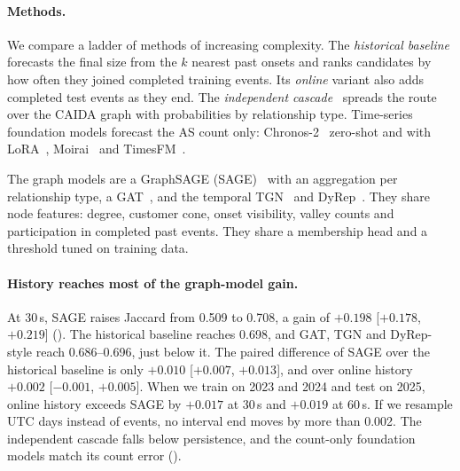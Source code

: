 \paragraph{Methods.}
We compare a ladder of methods of increasing complexity.
The \emph{historical baseline} forecasts the final size from the $k$ nearest past onsets and ranks candidates by how often they joined completed training events.
Its \emph{online} variant also adds completed test events as they end.
The \emph{independent cascade}~\cite{kempe2003influence} spreads the route over the CAIDA graph with probabilities by relationship type.
Time-series foundation models forecast the AS count only: Chronos-2~\cite{ansari2025chronos2} zero-shot and with LoRA~\cite{hu2022lora}, Moirai~\cite{woo2024moirai} and TimesFM~\cite{das2023timesfm}.

The graph models are a GraphSAGE (SAGE)~\cite{hamilton2017graphsage} with an aggregation per relationship type, a GAT~\cite{velickovic2018gat}, and the temporal TGN~\cite{rossi2020tgn} and DyRep~\cite{trivedi2019dyrep}.
They share node features: degree, customer cone, onset visibility, valley counts and participation in completed past events.
They share a membership head and a threshold tuned on training data.


\paragraph{History reaches most of the graph-model gain.}
At 30\,s, SAGE raises Jaccard from 0.509 to 0.708, a gain of $+0.198$ [$+0.178$, $+0.219$] ().
The historical baseline reaches 0.698, and GAT, TGN and DyRep-style reach 0.686--0.696, just below it.
The paired difference of SAGE over the historical baseline is only $+0.010$ [$+0.007$, $+0.013$], and over online history $+0.002$ [$-0.001$, $+0.005$].
When we train on 2023 and 2024 and test on 2025, online history exceeds SAGE by $+0.017$ at 30\,s and $+0.019$ at 60\,s.
If we resample UTC days instead of events, no interval end moves by more than 0.002.
The independent cascade falls below persistence, and the count-only foundation models match its count error ().

